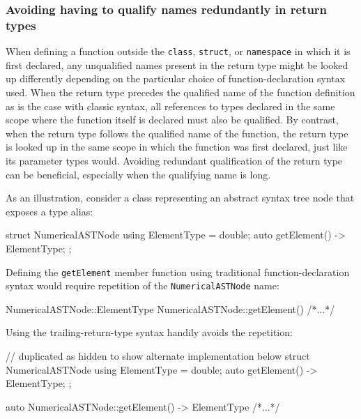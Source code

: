 \subsubsection[Avoiding having to qualify names redundantly in return types]{Avoiding having to qualify names redundantly in return types}\label{avoiding-having-to-qualify-names-redundantly-in-return-types}

When defining a function outside the \lstinline!class!, \lstinline!struct!, or
\lstinline!namespace! in which it is first declared, any unqualified names
present in the return type might be looked up differently depending on
the particular choice of function-declaration syntax used. When the
return type precedes the qualified name of the function definition as
is the case with classic syntax, all references to types declared in
the same scope where the function itself is declared must also be
qualified. By contrast, when the return type follows the
qualified name of the function,
the return type is looked up in the same scope in which the
function was first declared, just like its parameter types would. Avoiding redundant qualification of the return type  can be beneficial, especially when the qualifying name is long.

As an illustration, consider a class representing an abstract syntax
tree node that exposes a type alias:

\begin{emcppslisting}[emcppsbatch=e1]
struct NumericalASTNode
{
    using ElementType = double;
    auto getElement() -> ElementType;
};
\end{emcppslisting}

\noindent Defining the \lstinline!getElement! member function using traditional
function-declaration syntax would require repetition of the
\lstinline!NumericalASTNode! name:

\begin{emcppslisting}[emcppsbatch=e1]
NumericalASTNode::ElementType NumericalASTNode::getElement() { /*...*/ }
\end{emcppslisting}

\noindent Using the trailing-return-type syntax handily avoids the repetition:

\begin{emcppshiddenlisting}[emcppsbatch=e2]
// duplicated as hidden to show alternate implementation below
struct NumericalASTNode
{
    using ElementType = double;
    auto getElement() -> ElementType;
};
\end{emcppshiddenlisting}
\begin{emcppslisting}[emcppsbatch=e2]
auto NumericalASTNode::getElement() -> ElementType { /*...*/ }
\end{emcppslisting}


